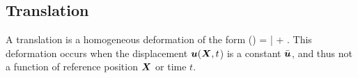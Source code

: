 %
%

\clearpage
\subsection{Translation}
\label{section:offset}
A translation is a homogeneous deformation of the form
\be
 \vvarphi(\vX) = \bar{\vu} + \vX.
\ee
This deformation occurs when the displacement 
$\mbox{\boldmath $u$}(\mbox{\boldmath $X$}, t$) is a constant 
$\bar{\mbox{\boldmath $u$}}$, 
and thus not a function of 
reference position $\mbox{\boldmath $X$}$ or time $t$.


